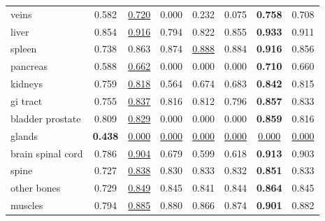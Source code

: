 \begin{minipage}{\textwidth}
{\begin{tabular}{@{}lccccccc@{}}
veins & 0.582 & \underline{0.720} & 0.000 & 0.232 & 0.075 & \textbf{0.758} & 0.708 \\
liver & 0.854 & \underline{0.916} & 0.794 & 0.822 & 0.855 & \textbf{0.933} & 0.911 \\
spleen & 0.738 & 0.863 & 0.874 & \underline{0.888} & 0.884 & \textbf{0.916} & 0.856 \\
pancreas & 0.588 & \underline{0.662} & 0.000 & 0.000 & 0.000 & \textbf{0.710} & 0.660 \\
kidneys & 0.759 & \underline{0.818} & 0.564 & 0.674 & 0.683 & \textbf{0.842} & 0.815 \\
gi tract & 0.755 & \underline{0.837} & 0.816 & 0.812 & 0.796 & \textbf{0.857} & 0.833 \\
bladder prostate & 0.809 & \underline{0.829} & 0.000 & 0.000 & 0.000 & \textbf{0.859} & 0.816 \\
glands & \textbf{0.438} & \underline{0.000} & \underline{0.000} & \underline{0.000} & \underline{0.000} & \underline{0.000} & \underline{0.000} \\
brain spinal cord & 0.786 & \underline{0.904} & 0.679 & 0.599 & 0.618 & \textbf{0.913} & 0.903 \\
spine & 0.727 & \underline{0.838} & 0.830 & 0.833 & 0.832 & \textbf{0.851} & 0.833 \\
other bones & 0.729 & \underline{0.849} & 0.845 & 0.841 & 0.844 & \textbf{0.864} & 0.845 \\
muscles & 0.794 & \underline{0.885} & 0.880 & 0.866 & 0.874 & \textbf{0.901} & 0.882 \\
\bottomrule
\end{tabular}
}\end{minipage}
\par\bigskip
